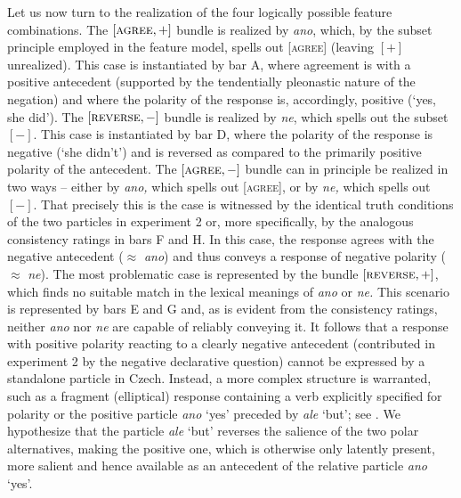 \documentclass[output=paper,colorlinks,citecolor=brown]{langscibook}
\begin{document}
Let us now turn to the realization of the four logically possible feature combinations. The $[\textsc{agree},+]$ bundle is realized by \textit{ano}, which, by the subset principle employed in the feature model, spells out \textsc{[agree]} (leaving $[+]$ unrealized). This case is instantiated by bar A, where agreement is with a positive antecedent (supported by the tendentially pleonastic nature of the negation) and where the polarity of the response is, accordingly, positive (`yes, she did'). The $[\textsc{reverse}, -]$ bundle is realized by \textit{ne}, which spells out the subset $[-]$. This case is instantiated by bar D, where the polarity of the response is negative (`she didn't') and is reversed as compared to the primarily positive polarity of the antecedent. The $[\textsc{agree},-]$ bundle can in principle be realized in two ways -- either by \textit{ano,} which spells out [\textsc{agree}], or by \textit{ne,} which spells out $[-]$. That precisely this is the case is witnessed by the identical truth conditions of the two particles in experiment 2 or, more specifically, by the analogous consistency ratings in bars F and H. In this case, the response agrees with the negative antecedent ($\approx$ \textit{ano}) and thus conveys a response of negative polarity ($\approx$ \textit{ne}). The most problematic case is represented by the bundle $[\textsc{reverse}, +]$, which finds no suitable match in the lexical meanings of \textit{ano} or \textit{ne.} This scenario is represented by bars E and G and, as is evident from the consistency ratings, neither \textit{ano} nor \textit{ne} are capable of reliably conveying it. It follows that a response with positive polarity reacting to a clearly negative antecedent (contributed in experiment 2 by the negative declarative question) cannot be expressed by a standalone particle in Czech. Instead, a more complex structure is warranted, such as a fragment (elliptical) response containing a verb explicitly specified for polarity \citep{Gruetskrabalova2015,gruet2016yes} or the positive particle \textit{ano} `yes' preceded by \textit{ale} `but'; see . We hypothesize that the particle \textit{ale} `but' reverses the salience of the two polar alternatives, making the positive one, which is otherwise only latently present, more salient and hence available as an antecedent of the relative particle \textit{ano} `yes'.

\ea\label{hrdsim:ex:verb}
\begin{exe}
\end{exe}
\z
\end{document}
